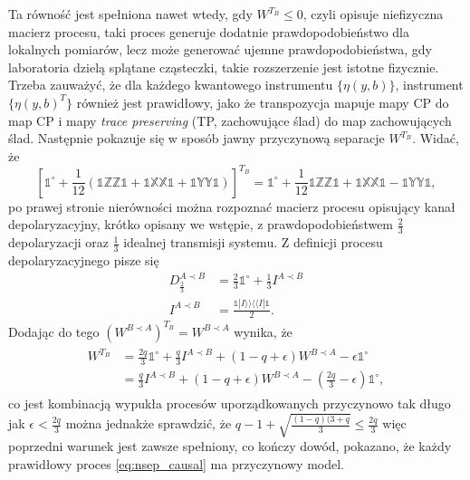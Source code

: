\documentclass[10pt]{article} %
\newcommand{\BBra}[1]{\langle\langle#1|}
\newcommand{\KKet}[1]{|#1\rangle\rangle}
\newcommand{\X}{\mathbb{X}}
\newcommand{\Y}{\mathbb{Y}}
\newcommand{\Z}{\mathbb{Z}}
\newcommand{\I}{\mathbb{1}}
\newcommand{\IO}{\mathbb{1}^\circ}
\begin{document}
Ta równość jest spełniona nawet wtedy, gdy $W^{T_B} \leq 0$, czyli opisuje niefizyczna macierz procesu, taki proces generuje dodatnie prawdopodobieństwo dla lokalnych pomiarów, lecz może generować ujemne prawdopodobieństwa, gdy laboratoria dzielą splątane cząsteczki, takie rozszerzenie jest istotne fizycznie.
Trzeba zauważyć, że dla każdego kwantowego instrumentu $\{ \eta(y,b) \}$, instrument $\{ \eta(y,b)^T \}$ również jest prawidłowy, jako że transpozycja mapuje mapy CP do map CP i mapy \textit{trace preserving} (TP, zachowujące ślad) do map zachowujących ślad. Następnie pokazuje się w sposób jawny przyczynową
separacje $W^{T_B}$. Widać, że 
\begin{equation}
\left[\IO + \frac{1}{12}\left(\I\Z\Z\I + \I\X\X\I + \I\Y\Y\I\right)\right]^{T_B} = \IO + \frac{1}{12}\I\Z\Z\I + \I\X\X\I - \I\Y\Y\I, 
\end{equation}
po prawej stronie nierówności można rozpoznać macierz procesu opisujący kanał depolaryzacyjny, krótko opisany we wstępie, z prawdopodobieństwem $\frac{2}{3}$ depolaryzacji oraz $\frac{1}{3}$ idealnej transmisji systemu.
Z definicji procesu depolaryzacyjnego pisze się
\begin{align}
D^{A \prec B}_{\frac{2}{3}} &= \frac{2}{3} \IO + \frac{1}{3}I^{A \prec B}  \\
I^{A \prec B} &= \frac{\I\KKet{I}\BBra{I}\I}{2}.
\end{align} Dodając do tego $\left(W^{B \prec A}\right)^{T_B} = W^{B \prec A}$
wynika, że 
\begin{align}
\label{eq:wtb_sep}
\begin{split}
W^{T_B} &= \frac{2q}{3}\IO + \frac{q}{3} I^{A \prec B} + (1-q+\epsilon)W^{B \prec A} - \epsilon \IO \\
 &= \frac{q}{3} I^{A \prec B} + (1-q+\epsilon) W^{B \prec A} - (\frac{2q}{3} - \epsilon) \IO,
\end{split}
\end{align} co jest kombinacją wypukła procesów uporządkowanych przyczynowo tak długo jak $\epsilon < \frac{2q}{3}$ można jednakże sprawdzić, że $q - 1 + \sqrt{\frac{(1-q)(3+q}{3}} \leq \frac{2q}{3}$ więc poprzedni warunek jest zawsze spełniony, co kończy dowód, pokazano, że każdy prawidłowy proces \eqref{eq:nsep_causal} ma przyczynowy model.
\end{document}
